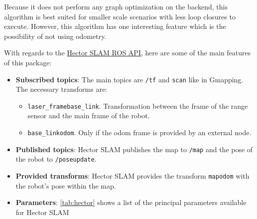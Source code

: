 Because it does not perform any graph optimization on the backend, this algorithm is best suited for smaller scale scenarios with less loop closures to execute. However, this algorithm has one interesting feature which is the possibility of not using odometry. 

With regards to the \href{http://wiki.ros.org/hector_slam}{Hector SLAM ROS API}, here are some of the main features of this package:
\begin{itemize}
  \item \textbf{Subscribed topics}: The main topics are \texttt{/tf} and \texttt{scan} like in Gmapping. The necessary transforms are:
  \begin{itemize}
    \item \texttt{laser\_frame}\arrow\texttt{base\_link}. Transformation between the frame of the range sensor and the main frame of the robot.
    \item \texttt{base\_link}\arrow\texttt{odom}. Only if the odom frame is provided by an external node.
  \end{itemize}  

  \item \textbf{Published topics}: Hector SLAM publishes the map to \texttt{/map} and the pose of the robot to \texttt{/poseupdate}.

  \item \textbf{Provided transforms}: Hector SLAM provides the transform \texttt{map}\arrow\texttt{odom} with the robot's pose within the map.

  \item \textbf{Parameters}: \autoref{tab:hector} shows a list of the principal parameters available for Hector SLAM
\end{itemize}
